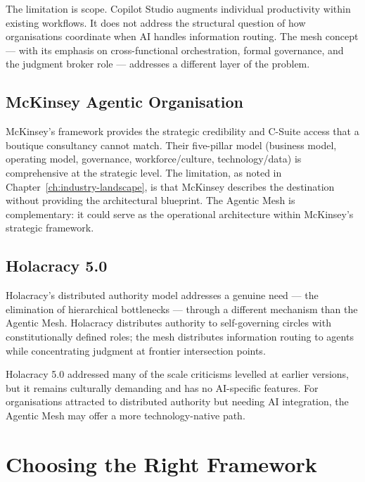 The limitation is scope. Copilot Studio augments individual productivity within existing workflows. It does not address the structural question of how organisations coordinate when AI handles information routing. The mesh concept --- with its emphasis on cross-functional orchestration, formal governance, and the judgment broker role --- addresses a different layer of the problem.

\subsection{McKinsey Agentic Organisation}

McKinsey's framework provides the strategic credibility and C-Suite access that a boutique consultancy cannot match. Their five-pillar model (business model, operating model, governance, workforce/culture, technology/data) is comprehensive at the strategic level. The limitation, as noted in Chapter~\ref{ch:industry-landscape}, is that McKinsey describes the destination without providing the architectural blueprint. The Agentic Mesh is complementary: it could serve as the operational architecture within McKinsey's strategic framework.

\subsection{Holacracy 5.0}

Holacracy's distributed authority model addresses a genuine need --- the elimination of hierarchical bottlenecks --- through a different mechanism than the Agentic Mesh. Holacracy distributes authority to self-governing circles with constitutionally defined roles; the mesh distributes information routing to agents while concentrating judgment at frontier intersection points.

Holacracy 5.0 addressed many of the scale criticisms levelled at earlier versions, but it remains culturally demanding and has no AI-specific features. For organisations attracted to distributed authority but needing AI integration, the Agentic Mesh may offer a more technology-native path.

\section{Choosing the Right Framework}

